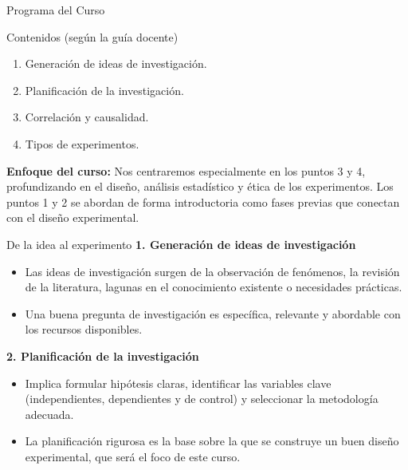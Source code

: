 ﻿\documentclass{beamer}
\begin{document}
\begin{frame}{Programa del Curso}
   \begin{block}{Contenidos (según la guía docente)}
      \begin{enumerate}
         \item Generación de ideas de investigación.
         \item Planificación de la investigación.
         \item Correlación y causalidad.
         \item Tipos de experimentos.
      \end{enumerate}
   \end{block}
   \vspace{0.3cm}
   \textbf{Enfoque del curso:} Nos centraremos especialmente en los puntos 3 y 4, profundizando en el diseño, análisis estadístico y ética de los experimentos. Los puntos 1 y 2 se abordan de forma introductoria como fases previas que conectan con el diseño experimental.
\end{frame}

\begin{frame}{De la idea al experimento}
   \textbf{1. Generación de ideas de investigación}
   \begin{itemize}
      \item Las ideas de investigación surgen de la observación de fenómenos, la revisión de la literatura, lagunas en el conocimiento existente o necesidades prácticas.
      \item Una buena pregunta de investigación es específica, relevante y abordable con los recursos disponibles.
   \end{itemize}
   \vspace{0.3cm}
   \textbf{2. Planificación de la investigación}
   \begin{itemize}
      \item Implica formular hipótesis claras, identificar las variables clave (independientes, dependientes y de control) y seleccionar la metodología adecuada.
      \item La planificación rigurosa es la base sobre la que se construye un buen diseño experimental, que será el foco de este curso.
   \end{itemize}
\end{frame}
\end{document}
